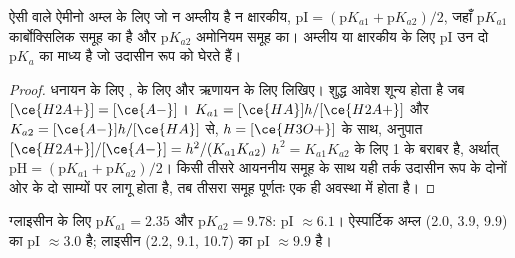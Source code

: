 \begin{proposition}[समविभव बिंदु]\label{prop:b2:biomolecules:pi}
ऐसी  वाले ऐमीनो अम्ल के लिए जो न अम्लीय है न क्षारकीय, $\mathrm{pI} = (\mathrm pK_{a1} +
\mathrm pK_{a2})/2$, जहाँ $\mathrm pK_{a1}$ कार्बोक्सिलिक समूह का है और $\mathrm pK_{a2}$
अमोनियम समूह का। अम्लीय या क्षारकीय  के लिए pI उन दो $\mathrm pK_a$ का माध्य है जो
उदासीन रूप को घेरते हैं।
\end{proposition}

\begin{proof}
धनायन के लिए ,  के लिए  और ऋणायन के लिए  लिखिए। शुद्ध आवेश
शून्य होता है जब $[\ce{H2A+}] = [\ce{A-}]$। $K_{a1} = [\ce{HA}]h/[\ce{H2A+}]$ और $K_{a2} =
[\ce{A-}]h/[\ce{HA}]$ से, $h = [\ce{H3O+}]$ के साथ, अनुपात $[\ce{H2A+}]/[\ce{A-}] = h^2/(K_{a1}K_{a2})$
$h^2 = K_{a1}K_{a2}$ के लिए 1 के बराबर है, अर्थात् $\mathrm{pH} = (\mathrm pK_{a1} + \mathrm pK_{a2})/2$। किसी
तीसरे आयननीय समूह के साथ यही तर्क उदासीन रूप के दोनों ओर के दो साम्यों पर लागू होता है,
तब तीसरा समूह पूर्णतः एक ही अवस्था में होता है।
\end{proof}

ग्लाइसीन के लिए $\mathrm pK_{a1} = 2.35$ और $\mathrm pK_{a2} = 9.78$: pI $\approx 6.1$। ऐस्पार्टिक अम्ल
(2.0, 3.9, 9.9) का pI $\approx 3.0$ है; लाइसीन (2.2, 9.1, 10.7) का pI $\approx 9.9$ है।

